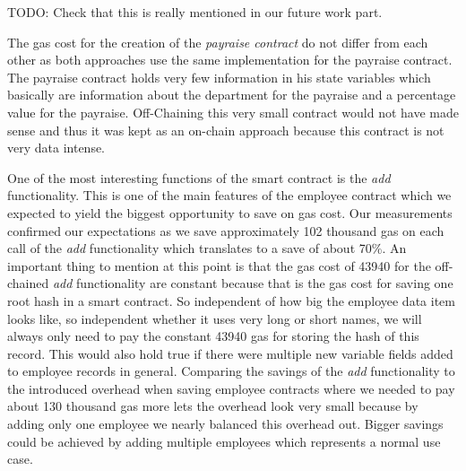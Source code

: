 TODO: Check that this is really mentioned in our future work part.

The gas cost for the creation of the \textit{payraise contract} do not differ from each other as both approaches use the same implementation for the payraise contract. The payraise contract holds very few information in his state variables which basically are information about the department for the payraise and a percentage value for the payraise. Off-Chaining this very small contract would not have made sense and thus it was kept as an on-chain approach because this contract is not very data intense.

One of the most interesting functions of the smart contract is the \textit{add} functionality. This is one of the main features of the employee contract which we expected to yield the biggest opportunity to save on gas cost. Our measurements confirmed our expectations as we save approximately 102 thousand gas on each call of the \textit{add} functionality which translates to a save of about 70\%. An important thing to mention at this point is that the gas cost of 43940 for the off-chained \textit{add} functionality are constant because that is the gas cost for saving one root hash in a smart contract. So independent of how big the employee data item looks like, so independent whether it uses very long or short names, we will always only need to pay the constant 43940 gas for storing the hash of this record. This would also hold true if there were multiple new variable fields added to employee records in general. Comparing the savings of the \textit{add} functionality to the introduced overhead when saving employee contracts where we needed to pay about 130 thousand gas more lets the overhead look very small because by adding only one employee we nearly balanced this overhead out. Bigger savings could be achieved by adding multiple employees which represents a normal use case.

